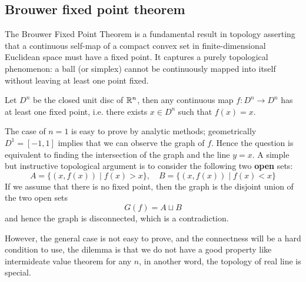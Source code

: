 \documentclass[12pt,a4paper]{article}
\begin{document}
\subsection{Brouwer fixed point theorem}
The Brouwer Fixed Point Theorem is a fundamental result in topology asserting that a continuous self-map of a compact convex set in finite-dimensional Euclidean space must have a fixed point.
It captures a purely topological phenomenon: a ball (or simplex) cannot be continuously mapped into itself without leaving at least one point fixed.
\begin{theorem}[Brouwer]
    Let \(D^n\) be the closed unit disc of \(\mathbb{R}^n\), then any continuous map \(f:D^n \to D^n\) has at least one fixed point, i.e. there exists \(x \in D^n\) such that \(f(x) = x\).
\end{theorem}
\begin{remark}
    The case of \(n=1\) is easy to prove by analytic methods; geometrically \(D^1 = [-1,1]\) implies that we can observe the graph of \(f\). Hence the question is equivalent to finding the intersection of the graph and the line \(y = x\). A simple but instructive topological argument is to consider the following two \textbf{open} sets:
    \[A = \{(x,f(x)) \mid f(x)>x\}, \quad B = \{(x,f(x)) \mid f(x)<x\}\]
    If we assume that there is no fixed point, then the graph is the disjoint union of the two open sets
    \[G(f) = A \sqcup B\]
    and hence the graph is disconnected, which is a contradiction.

    \begin{center}
    \end{center}

    However, the general case is not easy to prove, and the connectness will be a hard condition to use, the dilemma is that we do not have a good property like intermideate value theorem for any \(n\), in another word, the topology of real line is special.
\end{remark}
\end{document}
